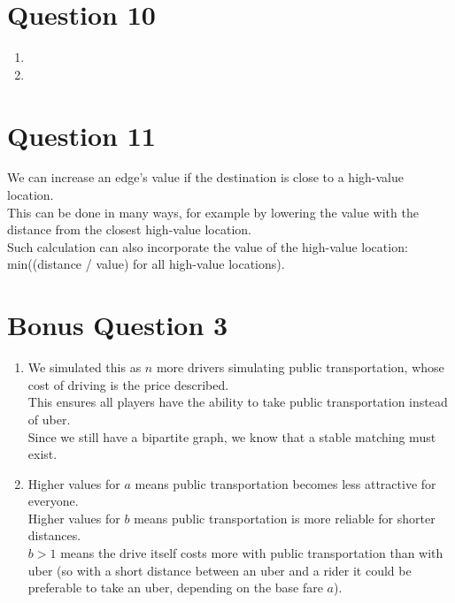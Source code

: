 \documentclass{article}
\begin{document}
\section{Question 10}

\begin{enumerate}[label=(\alph*)]

    \item 

    
    \item 


\end{enumerate}


\section{Question 11}
We can increase an edge's value if the destination is close to a high-value location.\\
This can be done in many ways, for example by lowering the value with the distance from the closest high-value location.\\ 
Such calculation can also incorporate the value of the high-value location: min((distance / value) for all high-value locations).

\section{Bonus Question 3}

\begin{enumerate}[label=(\alph*)]

    \item 
    We simulated this as $n$ more drivers simulating public transportation, whose cost of driving is the price described.\\
    This ensures all players have the ability to take public transportation instead of uber.\\
    Since we still have a bipartite graph, we know that a stable matching must exist.
    
    \item 
    Higher values for $a$ means public transportation becomes less attractive for everyone.\\
    Higher values for $b$ means public transportation is more reliable for shorter distances.\\
    $b>1$ means the drive itself costs more with public transportation than with uber (so with a short distance between an uber and a rider it could be preferable to take an uber, depending on the base fare $a$).\\

\end{enumerate}


\end{document}

